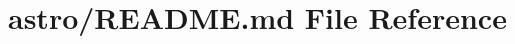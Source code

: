 \hypertarget{astro_2_r_e_a_d_m_e_8md}{}\section{astro/\+R\+E\+A\+D\+ME.md File Reference}
\label{astro_2_r_e_a_d_m_e_8md}
